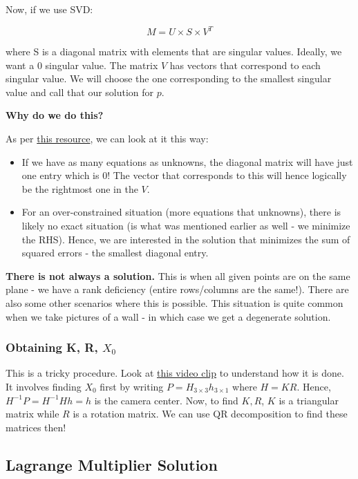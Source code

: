 Now, if we use SVD:

\begin{equation}
    M = U \times S \times V^T
\end{equation}

where S is a diagonal matrix with elements that are singular values. Ideally, we want a $0$ singular value. The matrix $V$ has vectors that correspond to each singular value. We will choose the one corresponding to the smallest singular value and call that our solution for $p$.

\textbf{Why do we do this?}

As per \href{http://newton.uam.mx/xgeorge/uea/graficacionII/homogeneous_equations.pdf}{this resource}, we can look at it this way:

\begin{itemize}
    \item If we have as many equations as unknowns, the diagonal matrix will have just one entry which is 0! The vector that corresponds to this will hence logically be the rightmost one in the $V$.
    \item For an over-constrained situation (more equations that unknowns), there is likely no exact situation (is what was mentioned earlier as well - we minimize the RHS). Hence, we are interested in the solution that minimizes the sum of squared errors - the smallest diagonal entry.
\end{itemize}

\textbf{There is not always a solution.} This is when all given points are on the same plane - we have a rank deficiency (entire rows/columns are the same!). There are also some other scenarios where this is possible. This situation is quite common when we take pictures of a wall - in which case we get a degenerate solution.  

\subsubsection{Obtaining K, R, $X_0$}

This is a tricky procedure. Look at \href{https://youtu.be/3NcQbZu6xt8?t=1543}{this video clip} to understand how it is done. It involves finding $X_0$ first by writing $P=H_{3\times3}h_{3\times1}$ where $H=KR$. Hence, $H^{-1}P = H^{-1}Hh = h$ is the camera center. Now, to find $K, R$, $K$ is a triangular matrix while $R$ is a rotation matrix. We can use QR decomposition to find these matrices then! 

\subsection{Lagrange Multiplier Solution}


